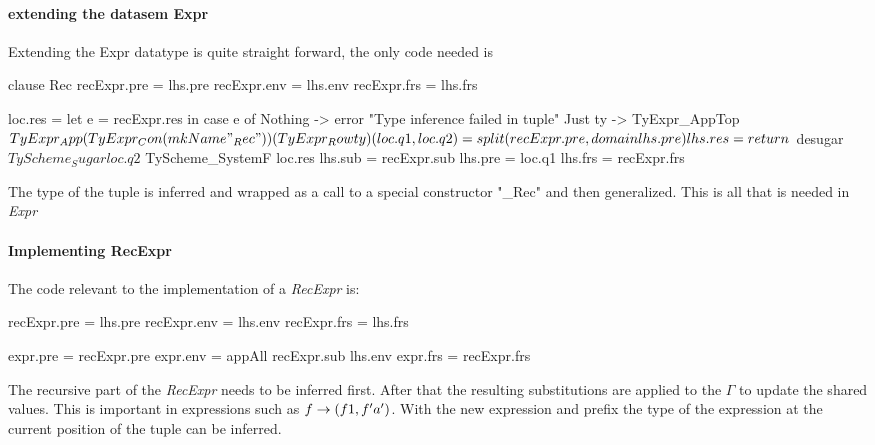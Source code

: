 \paragraph{extending the datasem Expr}
Extending the Expr datatype is quite straight forward, the only code needed is

\begin{code}
    clause Rec
       recExpr.pre = lhs.pre
       recExpr.env = lhs.env
       recExpr.frs = lhs.frs
       
       loc.res = let e = recExpr.res
                 in case e of
                      Nothing -> error "Type inference failed in tuple"
                      Just ty -> TyExpr_AppTop $
                                    TyExpr_App
                                       (TyExpr_Con (mkName "_Rec"))
                                       (TyExpr_Row ty)
       
       (loc.q1, loc.q2) = split (recExpr.pre, domain lhs.pre)
       lhs.res = return $ desugar $ TyScheme_Sugar loc.q2 $ TyScheme_SystemF loc.res
       lhs.sub = recExpr.sub
       lhs.pre = loc.q1
       lhs.frs = recExpr.frs
\end{code}
The type of the tuple is inferred and wrapped as a call to a special constructor "\_Rec" and then generalized. This is all that is needed in \emph{Expr}

\paragraph{Implementing RecExpr}
The code relevant to the implementation of a \emph{RecExpr} is:

\begin{code}
   recExpr.pre = lhs.pre
   recExpr.env = lhs.env
   recExpr.frs = lhs.frs
   
   expr.pre = recExpr.pre
   expr.env = appAll recExpr.sub lhs.env
   expr.frs = recExpr.frs
\end{code}
The recursive part of the \emph{RecExpr} needs to be inferred first. After that the resulting substitutions are applied to the $\Gamma$ to update the shared values. This is important in expressions such as $\\f \rightarrow (f 1, f 'a')$. With the new expression and prefix the type of the expression at the current position of the tuple can be inferred.


